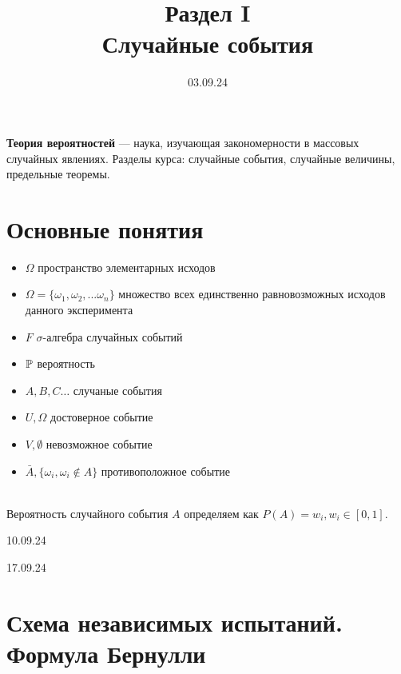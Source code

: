 

\title{Раздел I \\
       Случайные события}
\date{03.09.24}


    \maketitle
    
    \textbf{Теория вероятностей} — наука, изучающая закономерности 
    в массовых случайных явлениях. Разделы курса: случайные события, случайные 
    величины, предельные теоремы.

    \section{Основные понятия}

    \begin{itemize}
        \item \(\Omega\) пространство элементарных исходов 
        \item \(\Omega = \{\omega_1, \omega_2, ... \omega_n\}\)
        множество всех единственно равновозможных исходов данного эксперимента
        \item \(F\) \(\sigma\)-алгебра случайных событий
        \item \(\mathbb{P}\) вероятность
        \\
        \item \(A, B, C\dots\) случаные события
        \item \(U, \Omega\) достоверное событие
        \item \(V, \emptyset\) невозможное событие
        \item \(\bar A, \{\omega_i, \omega_i \notin A\}\) противоположное событие
    \end{itemize}
    \\
    Вероятность случайного события \(A\) определяем как \(P(A) = w_i, w_i \in [0,1]\).
    


    \vspace{2cm}
    \centering\large{10.09.24}



    \vspace{2cm}
    \centering\large{17.09.24}
    
    \section{Схема независимых испытаний. Формула Бернулли}

